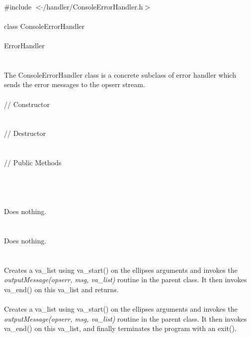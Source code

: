 
   \\
\indent \#include $<\tilde{ }$/handler/ConsoleErrorHandler.h$>$  \\

  \\
\indent class ConsoleErrorHandler \\

 \\
\indent ErrorHandler \\
\indent{} \\

  \\
\indent The ConsoleErrorHandler class is a concrete subclass of error
handler which sends the error messages to the opserr stream. \\

 \\
\indent // Constructor \\
\\ \\
\indent // Destructor \\
\\ \\
\indent // Public Methods  \\
\\
\\ 

  \\
  \\ 
Does nothing.\\

 \\
\\ 
Does nothing. \\

  \\
\\
Creates a va\_list using va\_start() on the ellipses arguments
and invokes the {\em outputMessage(opserr, msg, va\_list)} routine in
the parent class. It then invokes  va\_end() on this va\_list
and returns.\\ 

\\
Creates a va\_list using va\_start() on the ellipses arguments
and invokes the {\em outputMessage(opserr, msg, va\_list)} routine in
the parent class. It then invokes va\_end() on this va\_list,
and finally terminates the program with an exit(). 
